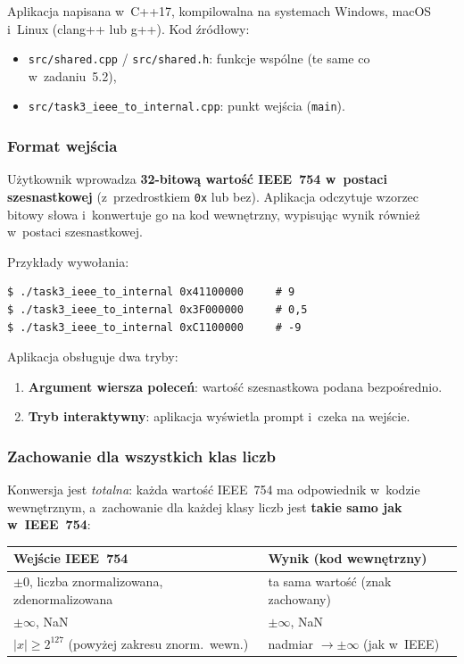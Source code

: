 \documentclass[12pt,a4paper]{article}
\begin{document}
Aplikacja napisana w~C++17, kompilowalna na systemach Windows, macOS i~Linux
(clang++ lub g++). Kod źródłowy:

\begin{itemize}
  \item \texttt{src/shared.cpp} / \texttt{src/shared.h}: funkcje wspólne
        (te same co w~zadaniu~5.2),
  \item \texttt{src/task3\_ieee\_to\_internal.cpp}: punkt wejścia (\texttt{main}).
\end{itemize}

\subsubsection*{Format wejścia}

Użytkownik wprowadza \textbf{32-bitową wartość IEEE~754 w~postaci szesnastkowej}
(z~przedrostkiem \texttt{0x} lub bez). Aplikacja odczytuje wzorzec bitowy słowa
i~konwertuje go na kod wewnętrzny, wypisując wynik również w~postaci szesnastkowej.

Przykłady wywołania:


\begin{lstlisting}[language={},numbers=none]
$ ./task3_ieee_to_internal 0x41100000     # 9
$ ./task3_ieee_to_internal 0x3F000000     # 0,5
$ ./task3_ieee_to_internal 0xC1100000     # -9
\end{lstlisting}

Aplikacja obsługuje dwa tryby:
\begin{enumerate}[label=\arabic*.]
  \item \textbf{Argument wiersza poleceń}: wartość szesnastkowa podana bezpośrednio.
  \item \textbf{Tryb interaktywny}: aplikacja wyświetla prompt i~czeka na wejście.
\end{enumerate}

\subsubsection*{Zachowanie dla wszystkich klas liczb}

Konwersja jest \emph{totalna}: każda wartość IEEE~754 ma odpowiednik w~kodzie
wewnętrznym, a~zachowanie dla każdej klasy liczb jest \textbf{takie samo jak
w~IEEE~754}:

\begin{center}
\begin{tabular}{ll}
\toprule
\textbf{Wejście IEEE~754} & \textbf{Wynik (kod wewnętrzny)} \\
\midrule
$\pm0$, liczba znormalizowana, zdenormalizowana & ta sama wartość (znak zachowany) \\
$\pm\infty$, NaN                                & $\pm\infty$, NaN \\
$|x| \geq 2^{127}$ (powyżej zakresu znorm.\ wewn.) & nadmiar $\to \pm\infty$ (jak w~IEEE) \\
\bottomrule
\end{tabular}
\end{center}
\end{document}
